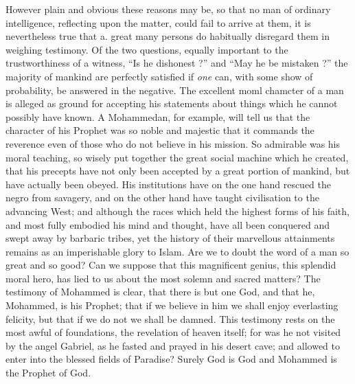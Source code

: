 \documentclass[12pt]{article}
\begin{document}
However plain and obvious these reasons may be, so that no man of ordinary intelligence, reflecting upon the matter, could fail to arrive at them, it is nevertheless true that a. great many persons do habitually disregard them in weighing testimony. Of the two questions, equally important to the trustworthiness of a witness, ``Is he dishonest ?'' and ``May he be mistaken ?'' the majority of mankind are perfectly satisfied if \emph{one} can, with some show of probability, be answered in the negative. The excellent moml chamcter of a man is alleged as ground for accepting his statements about things which he cannot possibly have known. A Mohammedan, for example, will tell us that the character of his Prophet was so noble and majestic that it commands the reverence even of those who do not believe in his mission. So admirable was his moral teaching, so wisely put together the great social machine which he created, that his precepts have not only been accepted by a great portion of mankind, but have actually been obeyed. His institutions have on the one hand rescued the negro from savagery, and on the other hand have taught civilisation to the advancing West; and although the races which held the highest forms of his faith, and most fully embodied his mind and thought, have all been conquered and swept away by barbaric tribes, yet the history of their marvellous attainments remains as an imperishable glory to Islam. Are we to doubt the word of a man so great and so good? Can we suppose that this magnificent genius, this splendid moral hero, has lied to us about the most solemn and sacred matters? The testimony of Mohammed is clear, that there is but one God, and that he, Mohammed, is his Prophet; that if we believe in him we shall enjoy everlasting felicity, but that if we do not we shall be damned. This testimony rests on the most awful of foundations, the revelation of heaven itself; for was he not visited by the angel Gabriel, as he fasted and prayed in his desert cave; and allowed to enter into the blessed fields of Paradise? Surely God is God and Mohammed is the Prophet of God.
\end{document}
